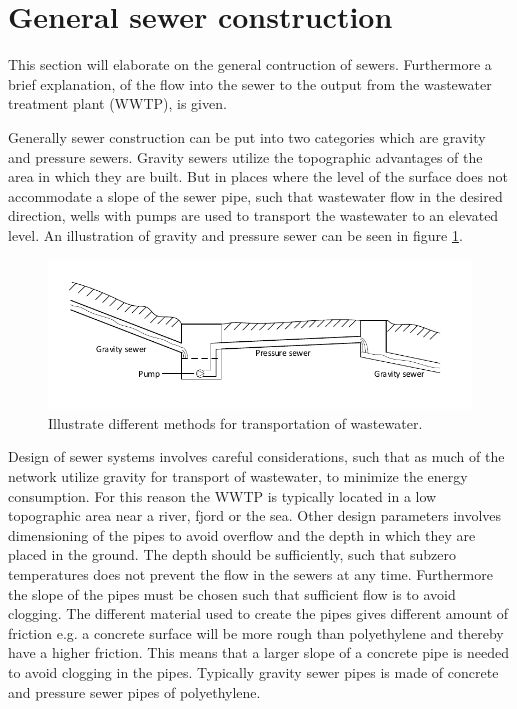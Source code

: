 \section{General sewer construction}\label{se:sewer_construction}
This section will elaborate on the general contruction of sewers. Furthermore a brief explanation, of the flow into the sewer to the output from the wastewater treatment plant (WWTP), is given.


Generally sewer construction can be put into two categories which are gravity and pressure sewers. Gravity sewers utilize the topographic advantages of the area in which they are built. But in places where the level of the surface does not accommodate a slope of the sewer pipe, such that wastewater flow in the desired direction, wells with pumps are used to transport the wastewater to an elevated level. An illustration of gravity and pressure sewer can be seen in figure \ref{fig:Sewer_drawing}. 

\begin{figure}[H]
\centering
\includegraphics[width=1\textwidth]{report/introduction/pictures/Sewer_drawing.pdf}
\caption{Illustrate different methods for transportation of wastewater.}
\label{fig:Sewer_drawing}
\end{figure}

Design of sewer systems involves careful considerations, such that as much of the network utilize gravity for transport of wastewater, to minimize the energy consumption. For this reason the WWTP is typically located in a low topographic area near a river, fjord or the sea. Other design parameters involves dimensioning of the pipes to avoid overflow and the depth in which they are placed in the ground. 
The depth should be sufficiently, such that subzero temperatures does not prevent the flow in the sewers at any time. Furthermore the slope of the pipes must be chosen such that sufficient flow is  to avoid clogging. The different material used to create the pipes gives different amount of friction e.g. a concrete surface will be more rough than polyethylene and thereby have a higher friction. This means that a larger slope of a concrete pipe is needed to avoid clogging in the pipes. Typically gravity sewer pipes is made of concrete and pressure sewer pipes of polyethylene.

